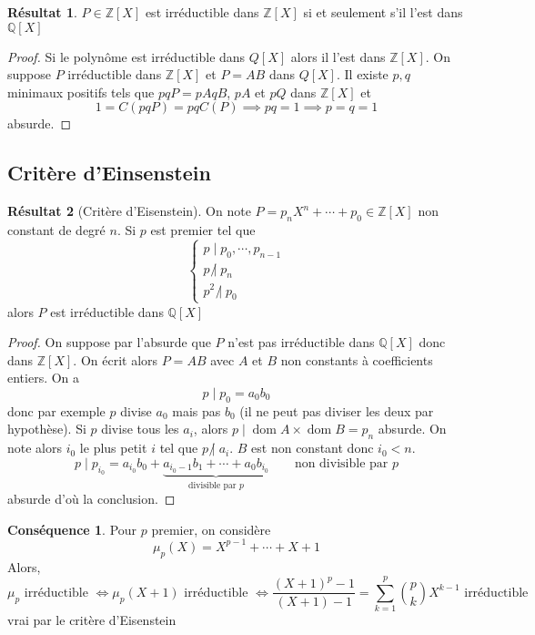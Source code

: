 \documentclass{article}
\theoremstyle{definition}
\newtheorem*{res}{Résultat}
\newtheorem{csq}{Conséquence}[subsection]
\DeclareMathOperator{\dom}{dom}
\begin{document}
\begin{res}
    $P\in\mathbb Z[X]$ est irréductible dans $\mathbb Z[X]$ si et seulement s'il l'est dans $\mathbb Q[X]$
\end{res}
\begin{proof}
Si le polynôme est irréductible dans $Q[X]$ alors il l'est dans $\mathbb Z[X]$. On suppose $P$ irréductible dans $\mathbb Z[X]$ et $P=AB$ dans $Q[X]$. Il existe $p, q$ minimaux positifs tels que $pqP=pAqB$, $pA$ et $pQ$ dans $\mathbb Z[X]$ et \[
    1=C(pqP)=pqC(P) \implies pq=1 \implies p=q=1
\]
absurde.
\end{proof}

\subsection{Critère d'Einsenstein} 

\begin{res}[Critère d'Eisenstein]
On note $P=p_nX^n+\cdots + p_0\in\mathbb Z[X]$ non constant de degré $n$. Si $p$ est premier tel que \[
    \begin{cases}
    p\;|\;p_0,\cdots, p_{n-1}\\ p\;\not|\;p_n\\p^2\;\not|\;p_0
    \end{cases}
\]
alors $P$ est irréductible dans $\mathbb Q[X]$
\end{res}
\begin{proof}
On suppose par l'absurde que $P$ n'est pas irréductible dans $\mathbb Q[X]$ donc dans $\mathbb Z[X]$. On écrit alors $P=AB$ avec $A$ et $B$ non constants à coefficients entiers. On a \[
    p\;|\;p_0=a_0b_0
\]
donc par exemple $p$ divise $a_0$ mais pas $b_0$ (il ne peut pas diviser les deux par hypothèse). Si $p$ divise tous les $a_i$, alors $p\;|\;\dom A\times \dom B=p_n$ absurde. On note alors $i_0$ le plus petit $i$ tel que $p\;\not |\;a_i$. $B$ est non constant donc $i_0<n$. \[
    p\;|\; p_{i_0}=a_{i_0}b_0+\underbrace{a_{i_0-1}b_1+\cdots +a_0b_{i_0}}_{\text{divisible par }p} \qquad \text{non divisible par }p
\]
absurde d'où la conclusion.
\end{proof}

\begin{csq}
Pour $p$ premier, on considère \[
    \mu_p(X)=X^{p-1}+\cdots+X+1
\]
Alors, \[
    \mu_p\text{ irréductible }\iff \mu_p(X+1)\text{ irréductible } \iff \frac{(X+1)^p-1}{(X+1)-1}=\sum_{k=1}^p\binom pk X^{k-1}\text{ irréductible}
\]
vrai par le critère d'Eisenstein
\end{csq}
\end{document}
